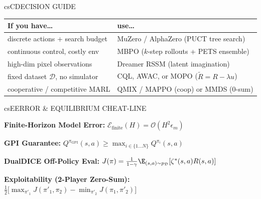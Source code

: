 \documentclass[../../../../master.tex]{subfiles}
\begin{document}
\begin{cscolumns}
\begin{cscard}{csC}{DECISION GUIDE}
  \renewcommand{\arraystretch}{1.15}\small
  \begin{tabular}{@{}>{\raggedright\arraybackslash}p{3.2cm}>{\raggedright\arraybackslash}p{4.6cm}@{}}
    \textbf{If you have\ldots} & \textbf{use\ldots}\\ \hline
    discrete actions + search budget & MuZero / AlphaZero (PUCT tree search)\\
    continuous control, costly env & MBPO ($k$-step rollouts + PETS ensemble)\\
    high-dim pixel observations & Dreamer RSSM (latent imagination)\\
    fixed dataset $\mathcal{D}$, no simulator & CQL, AWAC, or MOPO ($\tilde{R}=R-\lambda u$)\\
    cooperative / competitive MARL & QMIX / MAPPO (coop) or MMDS (0-sum)\\
  \end{tabular}
\end{cscard}

\begin{cscard}{csE}{ERROR \& EQUILIBRIUM CHEAT-LINE}
  \begin{csbul}
    \item \textbf{Finite-Horizon Model Error:} $\mathcal{E}_{\mathrm{finite}}(H) = \mathcal{O}(H^2\epsilon_m)$
    \item \textbf{GPI Guarantee:} $Q^{\pi_{\mathrm{GPI}}}(s,a) \ge \max_{i\in\{1\dots N\}} Q^{\pi_i}(s,a)$
    \item \textbf{DualDICE Off-Policy Eval:} $J(\pi)=\frac{1}{1-\gamma}\E_{(s,a)\sim p_{\mathcal{D}}}[\zeta^*(s,a)R(s,a)]$
    \item \textbf{Exploitability (2-Player Zero-Sum):} $\frac{1}{2}\big[\max_{\pi'_1}J(\pi'_1,\pi_2)-\min_{\pi'_2}J(\pi_1,\pi'_2)\big]$
  \end{csbul}
\end{cscard}


\end{cscolumns}
\end{document}
